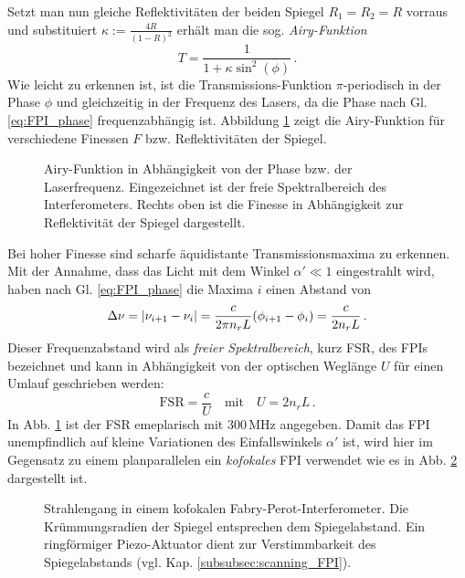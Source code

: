 Setzt man nun gleiche Reflektivitäten der beiden Spiegel $R_1=R_2=R$ vorraus und
substituiert $\kappa:=\frac{4R}{(1-R)^2}$ erhält man die sog.
\textit{Airy-Funktion}
\begin{equation}\label{eq:FPI_airy-funktion}
	T=\frac{1}{1+\kappa\sin^2{(\phi)}}\,.
\end{equation}
Wie leicht zu erkennen ist, ist die Transmissions-Funktion $\pi$-periodisch in
der Phase $\phi$ und gleichzeitig in der Frequenz des Lasers, da die Phase nach
Gl. \eqref{eq:FPI_phase} frequenzabhängig ist. Abbildung
\ref{fig:airy-funktion} zeigt die Airy-Funktion für verschiedene Finessen
$F$ bzw. Reflektivitäten der Spiegel.
\begin{figure}[h]
	\centering
	\footnotesize
	
	\caption[Airy-Funktion]{Airy-Funktion
	in Abhängigkeit von der Phase bzw.
	der Laserfrequenz. Eingezeichnet ist
	der freie Spektralbereich des
	Interferometers. Rechts oben ist die
	Finesse in Abhängigkeit zur
	Reflektivität der Spiegel dargestellt.}\label{fig:airy-funktion}
\end{figure}
Bei hoher Finesse sind scharfe
äquidistante Transmissionsmaxima zu erkennen. Mit der Annahme, dass das Licht
mit dem Winkel $\alpha'\ll1$ eingestrahlt wird, haben nach Gl.
\eqref{eq:FPI_phase} die Maxima $i$ einen Abstand von
\begin{equation}\label{eq:FPI_transmissionsmaxima}
	\Delta\nu=\left|\nu_{i+1}-\nu_i\right|=\frac{c}{2\pi	n_rL}(\phi_{i+1}-\phi_i)=\frac{c}{2n_rL}\,.
\end{equation}
Dieser Frequenzabstand wird als \textit{freier Spektralbereich}, kurz FSR, des
FPIs bezeichnet und kann in Abhängigkeit von der optischen Weglänge $U$ für
einen Umlauf geschrieben werden:
\begin{equation}\label{eq:FPI_FSR_01}
	\text{FSR}=\frac{c}{U}
	\quad\text{mit}\quad
	U=2n_rL\,.
\end{equation}
In Abb. \ref{fig:airy-funktion} ist der FSR emeplarisch mit $300\,$MHz
angegeben. Damit das FPI unempfindlich auf kleine Variationen des Einfallswinkels $\alpha'$
ist, wird hier im Gegensatz zu einem planparallelen ein \textit{kofokales} FPI
verwendet wie es in Abb. \ref{fig:FPI_kofokal} dargestellt ist.
\begin{figure}[h]
 	\centering
	\caption[FPI - kofokal]{Strahlengang in einem
	kofokalen Fabry-Perot-Interferometer. Die
	Krümmungsradien der Spiegel entsprechen dem
	Spiegelabstand. Ein ringförmiger Piezo-Aktuator dient zur
	Verstimmbarkeit des Spiegelabstands (vgl. Kap.
	\ref{subsubsec:scanning_FPI}).}\label{fig:FPI_kofokal}
\end{figure}
